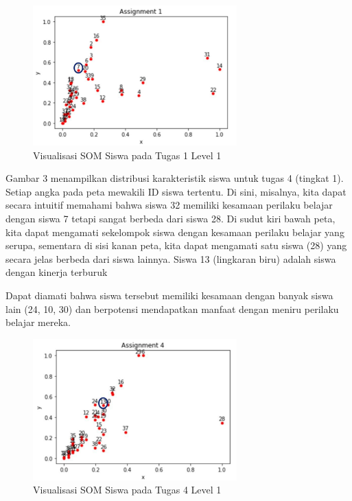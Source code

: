     \begin{figure}[H]
        \centering
        \includegraphics[width=0.7\textwidth]{Gambar/gambar5.2.png}
        \caption{Visualisasi SOM Siswa pada Tugas 1 Level 1}
    \end{figure}

    Gambar 3 menampilkan distribusi karakteristik siswa untuk tugas 4 (tingkat 1). Setiap angka pada peta mewakili ID siswa tertentu. Di sini, misalnya, kita dapat secara intuitif memahami bahwa siswa 32 memiliki kesamaan perilaku belajar dengan siswa 7 tetapi sangat berbeda dari siswa 28. Di sudut kiri bawah peta, kita dapat mengamati sekelompok siswa dengan kesamaan perilaku belajar yang serupa, sementara di sisi kanan peta, kita dapat mengamati satu siswa (28) yang secara jelas berbeda dari siswa lainnya. Siswa 13 (lingkaran biru) adalah siswa dengan kinerja terburuk

    Dapat diamati bahwa siswa tersebut memiliki kesamaan dengan banyak siswa lain (24, 10, 30) dan berpotensi mendapatkan manfaat dengan meniru perilaku belajar mereka.

    \begin{figure}[H]
        \centering
        \includegraphics[width=0.7\textwidth]{Gambar/gambar5.3.png}
        \caption{Visualisasi SOM Siswa pada Tugas 4 Level 1}
    \end{figure}

